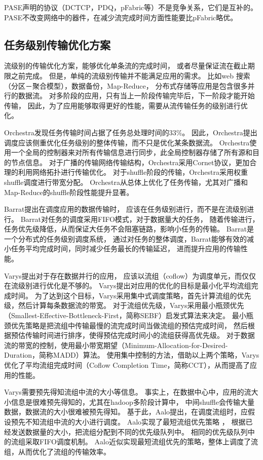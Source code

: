 PASE\cite{PASE}声明的协议（DCTCP，PDQ，pFabric等）不是竞争关系，它们是互补的。
PASE不改变网络中的器件，在减少流完成时间方面性能要比pFabric略优。
 
\subsection{任务级别传输优化方案}
流级别的传输优化方案，能够优化单条流的完成时间，
或者尽量保证流在截止期限之前完成。
但是，单纯的流级别传输并不能满足应用的需求。
比如web 搜索（分区－聚合模型），数据备份，Map-Reduce，
分布式存储等应用是包含很多并行的数据流。
对多阶段的应用，只有当上一阶段传输完毕后，下一阶段才能开始传输，
因此，为了应用能够取得更好的性能，需要从流传输任务的级别进行优化。

Orchestra\cite{Chowdhury2011Managing}发现任务传输时间占据了任务总处理时间的33$\%$\cite{Chowdhury2011Managing}。
因此，Orchestra提出调度应该侧重优化任务级别的整体传输，而不只是优化某条数据流。
Orchestra使用一个全局的控制器来对所有传输信息进行同步，此全局控制器存储了所有源和目的节点信息。
对于广播的传输网络传输结构，Orchestra采用Cornet协议，更加合理的利用网络拓扑进行传输优化。
对于shuffle阶段的传输，Orchestra采用权重shuffle调度进行带宽分配。
Orchestra从总体上优化了任务传输，尤其对广播和Map-Reduce的shuffle阶段性能提升显著。

Barrat\cite{dogar2014decentralized}提出在调度应用的数据传输时，
应该在任务级别进行，而不是在流级别进行。
Barrat对任务的调度采用FIFO模式，对于数据量大的任务，
随着传输进行，任务优先级降低，从而保证大任务不会阻塞链路，影响小任务的传输。
Barrat是一个分布式的任务级别调度系统，
通过对任务的整体调度，Barrat能够有效的减小任务平均完成时间，同时减少任务最长的传输延迟，
进而提升应用的传输性能。


Varys\cite{chowdhury2014efficient}提出对于存在数据并行的应用，
应该以流组（coflow）\cite{chowdhury2012coflow}为调度单元，而仅仅在流级别进行优化是不够的。
Varys提出对应用的优化的目标是最小化平均流组完成时间。
为了达到这个目标，Varys采用集中式调度策略，首先计算流组的优先级，然后计算每条数据流的带宽。
对于流组优先级，Varys采用最小瓶颈优先（Smallest-Effective-Bottleneck-First，简称SEBF）启发式算法来决定。
最小瓶颈优先策略是把流组中传输最慢的流完成时间当做流组的预估完成时间，
然后根据预估传输时间进行排序，使得预估完成时间小的流组获得高优先级。
对于数据流的带宽的控制，使用最小带宽期望（Minimum-Allocation-for-Desired-Duration，简称MADD）算法。
使用集中控制的方法，借助以上两个策略，Varys优化了平均流组完成时间（Coflow Completion Time，简称CCT），从而提高了应用的性能。

Varys需要预先得知流组中流的大小等信息。
事实上，在数据中心中，应用的流大小信息是很难预先得知的，尤其在hadoop多阶段计算中，
中间shuffle会传输大量数据，数据流的大小很难被预先得知。
基于此，Aalo\cite{chowdhury2015efficient}提出，在调度流组时，应假设预先不知流组中流的大小进行调度。
Aalo实现了最短流组优先策略 ，
根据已经发送数据量的大小，把流组分配到不同的优先级队列中。
相同的优先级队列中的流组采取FIFO调度机制。
Aalo近似实现最短流组优先的策略，整体上调度了流组，从而优化了流组的传输效率。

